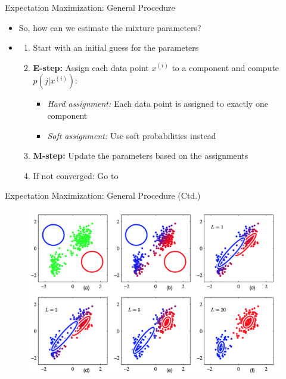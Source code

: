 \begin{frame}{Expectation Maximization: General Procedure}{}
	\begin{itemize}
		\item So, how can we estimate the mixture parameters?
		\item {}
		\begin{enumerate}
			\item Start with an initial guess for the parameters
			\item \textbf{E-step:} Assign each data point $x^{(i)}$ to a component and compute $p(j \vert x^{(i)})$:
			\begin{itemize}
				\item \textit{Hard assignment:} Each data point is assigned to exactly one component  
				\item \textit{Soft assignment:} Use soft probabilities instead
			\end{itemize}
			\item \textbf{M-step:} Update the parameters based on the assignments
			\item If not converged: Go to 
		\end{enumerate}
	\end{itemize}
\end{frame}


\begin{frame}{Expectation Maximization: General Procedure (Ctd.)}{}
	\begin{figure}
		\includegraphics[scale=0.45]{04_density_estimation/02_img/em}
	\end{figure}
\end{frame}


